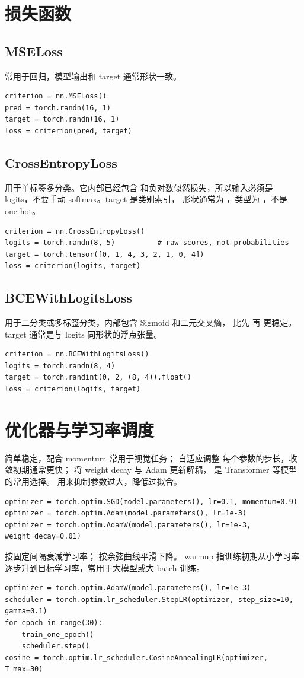\section{损失函数}
\subsection{MSELoss}
 常用于回归，模型输出和 target 通常形状一致。
\begin{lstlisting}
criterion = nn.MSELoss()
pred = torch.randn(16, 1)
target = torch.randn(16, 1)
loss = criterion(pred, target)
\end{lstlisting}
\subsection{CrossEntropyLoss}
 用于单标签多分类。它内部已经包含 
和负对数似然损失，所以输入必须是 logits，不要手动 softmax。target 是类别索引，
形状通常为 \code{[N]}，类型为 ，不是 one-hot。
\begin{lstlisting}
criterion = nn.CrossEntropyLoss()
logits = torch.randn(8, 5)          # raw scores, not probabilities
target = torch.tensor([0, 1, 4, 3, 2, 1, 0, 4])
loss = criterion(logits, target)
\end{lstlisting}
\subsection{BCEWithLogitsLoss}
 用于二分类或多标签分类，内部包含 Sigmoid 和二元交叉熵，
比先  再  更稳定。target 通常是与 logits 同形状的浮点张量。
\begin{lstlisting}
criterion = nn.BCEWithLogitsLoss()
logits = torch.randn(8, 4)
target = torch.randint(0, 2, (8, 4)).float()
loss = criterion(logits, target)
\end{lstlisting}
\section{优化器与学习率调度}
 简单稳定，配合 momentum 常用于视觉任务； 自适应调整
每个参数的步长，收敛初期通常更快； 将 weight decay 与 Adam 更新解耦，
是 Transformer 等模型的常用选择。 用来抑制参数过大，降低过拟合。
\begin{lstlisting}
optimizer = torch.optim.SGD(model.parameters(), lr=0.1, momentum=0.9)
optimizer = torch.optim.Adam(model.parameters(), lr=1e-3)
optimizer = torch.optim.AdamW(model.parameters(), lr=1e-3, weight_decay=0.01)
\end{lstlisting}
 按固定间隔衰减学习率； 按余弦曲线平滑下降。
warmup 指训练初期从小学习率逐步升到目标学习率，常用于大模型或大 batch 训练。
\begin{lstlisting}
optimizer = torch.optim.AdamW(model.parameters(), lr=1e-3)
scheduler = torch.optim.lr_scheduler.StepLR(optimizer, step_size=10, gamma=0.1)
for epoch in range(30):
    train_one_epoch()
    scheduler.step()
cosine = torch.optim.lr_scheduler.CosineAnnealingLR(optimizer, T_max=30)
\end{lstlisting}
